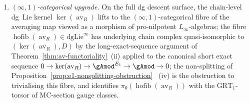 \begin{theorem}
\begin{enumerate}[label=\textup{(\roman*)}]
\item \emph{$(\infty,1)$-categorical upgrade.} On the full dg descent
surface, the chain-level dg~Lie kernel
\(\ker(\operatorname{av}_R)\) lifts to the
$(\infty,1)$-categorical fibre of the averaging map viewed as a
morphism of pro-nilpotent $L_\infty$-algebras; the fibre
$\operatorname{hofib}(\operatorname{av}_R)\in\mathrm{dgLie}^{\infty}$
has underlying chain complex quasi-isomorphic to
$(\ker(\operatorname{av}_R),D)$ by the
long-exact-sequence argument of
Theorem~\textup{\ref{thm:av-functoriality}}~\textup{(ii)} applied
to the canonical short exact sequence
$0\to\ker(\operatorname{av}_R)\to{\gAmod}^{E_1}\to\gAmod\to 0$; the
non-splitting of Proposition~\textup{\ref{prop:e1-nonsplitting-obstruction}}~%
\textup{(iv)} is the obstruction to trivialising this fibre, and
identifies $\pi_0(\operatorname{hofib}(\operatorname{av}_R))$ with
the $\mathrm{GRT}_1$-torsor of MC-section gauge classes.
\end{enumerate}
\end{theorem}

